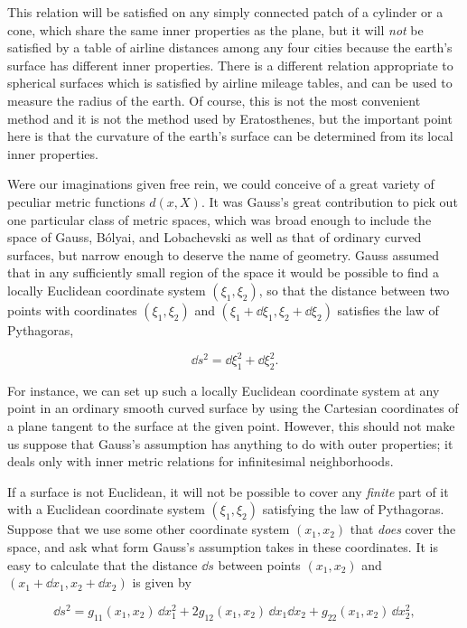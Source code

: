 This relation will be satisfied on any simply connected patch of a cylinder
or a cone, which share the same inner properties as the plane, but it will
\emph{not} be satisfied by a table of airline distances among any four cities
because the earth's surface has different inner properties. There is a
different relation appropriate to spherical surfaces which is satisfied by
airline mileage tables, and can be used to measure the radius of the earth. Of
course, this is not the most convenient method and it is not the method used by
Eratosthenes, but the important point here is that the curvature of the earth's
surface can be determined from its local inner properties.

Were our imaginations given free rein, we could conceive of a great variety of
peculiar metric functions \(d(x,X)\). It was Gauss's great contribution to
pick out one particular class of metric spaces, which was broad enough to
include the space of Gauss, B\'olyai, and Lobachevski as well as that of
ordinary curved surfaces, but narrow enough to deserve the name of geometry.
Gauss assumed that in any sufficiently small region of the space it would be
possible to find a locally Euclidean coordinate system \((\xi_1,\xi_2)\), so
that the distance between two points with coordinates \((\xi_1,\xi_2)\) and
\((\xi_1+\dd\xi_1,\xi_2+\dd\xi_2)\) satisfies the law of Pythagoras,

\begin{equation}
  \dd s^2=\dd\xi_1^2+\dd\xi_2^2.
  \tag{1.1.5}\label{eq:1.1.5}
\end{equation}

For instance, we can set up such a locally Euclidean coordinate system at any
point in an ordinary smooth curved surface by using the Cartesian coordinates
of a plane tangent to the surface at the given point. However, this should not
make us suppose that Gauss's assumption has anything to do with outer
properties; it deals only with inner metric relations for infinitesimal
neighborhoods.

If a surface is not Euclidean, it will not be possible to cover any
\emph{finite} part of it with a Euclidean coordinate system
\((\xi_1,\xi_2)\) satisfying the law of Pythagoras. Suppose that we use some
other coordinate system \((x_1,x_2)\) that \emph{does} cover the space, and
ask what form Gauss's assumption takes in these coordinates. It is easy to
calculate that the distance \(\dd s\) between points \((x_1,x_2)\) and
\((x_1+\dd x_1,x_2+\dd x_2)\) is given by

\begin{equation}
  \dd s^2=g_{11}(x_1,x_2)\,\dd x_1^2
      +2g_{12}(x_1,x_2)\,\dd x_1\dd x_2
      +g_{22}(x_1,x_2)\,\dd x_2^2,
  \tag{1.1.6}\label{eq:1.1.6}
\end{equation}

